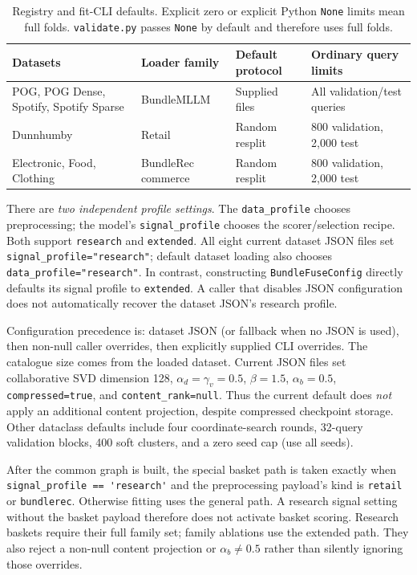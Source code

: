 \documentclass[11pt,a4paper]{article}
\newcommand{\code}[1]{\nolinkurl{#1}}
\numberwithin{equation}{section}
\begin{document}
\begin{table}[htbp]\centering\small
\begin{tabularx}{\linewidth}{@{}p{.25\linewidth}YYY@{}}
\toprule Datasets & Loader family & Default protocol & Ordinary query limits \\\midrule
POG, POG Dense, Spotify, Spotify Sparse & BundleMLLM & Supplied files & All validation/test queries \\
Dunnhumby & Retail & Random resplit & 800 validation, 2,000 test \\
Electronic, Food, Clothing & BundleRec commerce & Random resplit & 800 validation, 2,000 test \\
\bottomrule
\end{tabularx}
\caption{Registry and fit-CLI defaults. Explicit zero or explicit Python \code{None} limits mean full folds. \code{validate.py} passes \code{None} by default and therefore uses full folds.}
\end{table}

There are \emph{two independent profile settings}. The \code{data_profile} chooses
preprocessing; the model's \code{signal_profile} chooses the scorer/selection recipe.
Both support \code{research} and \code{extended}. All eight current dataset JSON files
set \code{signal_profile="research"}; default dataset loading also chooses
\code{data_profile="research"}. In contrast, constructing \code{BundleFuseConfig}
directly defaults its signal profile to \code{extended}. A caller that disables JSON
configuration does not automatically recover the dataset JSON's research profile.

Configuration precedence is: dataset JSON (or fallback when no JSON is used), then non-null
caller overrides, then explicitly supplied CLI overrides. The catalogue size comes from
the loaded dataset. Current JSON files set collaborative SVD dimension 128,
$\alpha_d=\gamma_v=0.5$, $\beta=1.5$, $\alpha_b=0.5$,
\code{compressed=true}, and \code{content_rank=null}. Thus the current default does
\emph{not} apply an additional content projection, despite compressed checkpoint storage.
Other dataclass defaults include four coordinate-search rounds, 32-query validation blocks,
400 soft clusters, and a zero seed cap (use all seeds).

After the common graph is built, the special basket path is taken exactly when
\code{signal_profile == 'research'} and the preprocessing payload's kind is
\code{retail} or \code{bundlerec}. Otherwise fitting uses the general path. A research
signal setting without the basket payload therefore does not activate basket scoring.
Research baskets require their full family set; family ablations use the extended path.
They also reject a non-null content projection or $\alpha_b\ne0.5$ rather than silently
ignoring those overrides.
\end{document}
